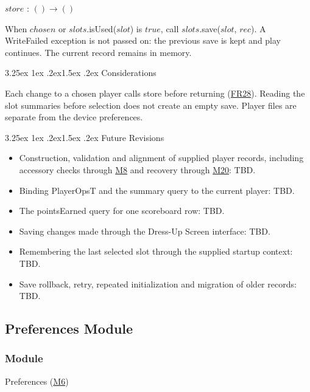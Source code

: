 \documentclass[10pt, titlepage]{article}
\makeatletter
\newcommand{\srsurl}{https://team-hindsight.github.io/ophthamology-game/SRS/SRS.pdf}
\newcommand{\srsitemref}[2]{\href{\srsurl\#nameddest=#1}{#2}}
\newcommand{\misref}[2]{\hyperref[mis:#1]{M#2}}
\renewcommand\paragraph{\@startsection{paragraph}{4}{\z@}%
  {3.25ex \@plus 1ex \@minus .2ex}{1.5ex \@plus .2ex}%
  {\normalfont\normalsize\bfseries}}
\newcommand{\T}[1]{\mathit{#1}}          %
\newcommand{\true}{\mathit{true}}
\makeatother
\begin{document}
$\T{store}$ : $() \to ()$

When $\T{chosen}$ or $\T{slots}$.isUsed($\T{slot}$) is $\true$,
call $\T{slots}$.save($\T{slot}$, $\T{rec}$). A WriteFailed
exception is not passed on: the previous save is kept and play continues.
The current record remains in memory.

\paragraph{Considerations}

Each change to a chosen player calls store before returning
(\srsitemref{FR_PersistState}{FR28}). Reading the slot summaries before
selection does not create an empty save. Player files are separate from
the device preferences.

\paragraph{Future Revisions}

\begin{itemize}
\item Construction, validation and alignment of supplied player records,
  including accessory checks through \misref{Accessories}{8} and recovery through \misref{DataFile}{20}: TBD.
\item Binding PlayerOpsT and the summary query to the current player: TBD.
\item The pointsEarned query for one scoreboard row: TBD.
\item Saving changes made through the Dress-Up Screen interface: TBD.
\item Remembering the last selected slot through the supplied startup
  context: TBD.
\item Save rollback, retry, repeated initialization and migration of
  older records: TBD.
\end{itemize}

\newpage
\subsection{Preferences Module} \label{mis:Prefs}

\subsubsection{Module}

Preferences (\misref{Prefs}{6})
\end{document}
